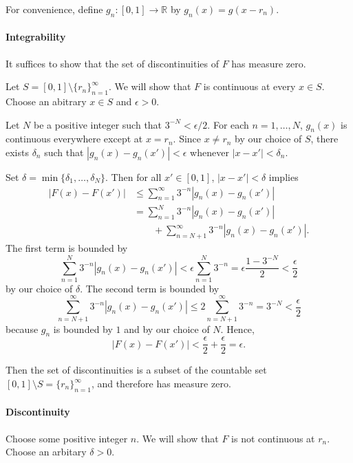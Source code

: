 \documentclass[oneside]{article}
\newcommand\abs[1]{\left|#1\right|}
\newcommand\bbR{\mathbb{R}}
\begin{document}
\begin{enumerate}[label=(\alph*)]
      For convenience, define $g_n : [0, 1] \to \bbR$ by $g_n(x) = g(x - r_n)$.

      \paragraph{Integrability} It suffices to show that the set of discontinuities of $F$ has measure zero.

      Let $S = [0,1]\setminus \{r_n\}_{n=1}^\infty$. We will show that $F$ is continuous at every $x \in S$. Choose an abitrary $x \in S$ and $\epsilon > 0$.

      Let $N$ be a positive integer such that $3^{-N} < \epsilon/2$. For each $n = 1, \dots, N$, $g_n(x)$ is continuous everywhere except at $x = r_n$. Since $x \neq r_n$ by our choice of $S$, there exists $\delta_n$ such that $\abs{g_n(x) - g_n(x')} < \epsilon$ whenever $\abs{x - x'} < \delta_n$.

      Set $\delta = \min\{\delta_1, \dots, \delta_N\}$. Then for all $x' \in [0, 1]$, $\abs{x - x'} < \delta$ implies \begin{align*}
        \abs{F(x) - F(x')}
        &\leq \sum_{n=1}^\infty 3^{-n} \abs{g_n(x) - g_n(x')} \\
        &= \sum_{n=1}^N 3^{-n} \abs{g_n(x) - g_n(x')} \\
        &\qquad+ \sum_{n=N+1}^\infty 3^{-n} \abs{g_n(x) - g_n(x')} \text{.}
      \end{align*} The first term is bounded by \[
        \sum_{n=1}^N 3^{-n} \abs{g_n(x) - g_n(x')}
        < \epsilon\sum_{n=1}^N 3^{-n}
        = \epsilon \frac{1 - 3^{-N}}{2} < \frac{\epsilon}{2}
      \] by our choice of $\delta$. The second term is bounded by \[
        \sum_{n=N+1}^\infty 3^{-n} \abs{g_n(x) - g_n(x')}
        \leq 2 \sum_{n=N+1}^\infty 3^{-n} = 3^{-N} < \frac{\epsilon}{2}
      \] because $g_n$ is bounded by $1$ and by our choice of $N$. Hence, \[
        \abs{F(x) - F(x')} < \frac{\epsilon}{2} + \frac{\epsilon}{2} = \epsilon \text{.}
      \]

      Then the set of discontinuities is a subset of the countable set $[0,1]\setminus S = \{r_n\}_{n=1}^\infty$, and therefore has measure zero.

      \paragraph{Discontinuity} Choose some positive integer $n$. We will show that $F$ is not continuous at $r_n$. Choose an arbitary $\delta > 0$.


\end{enumerate}
\end{document}
